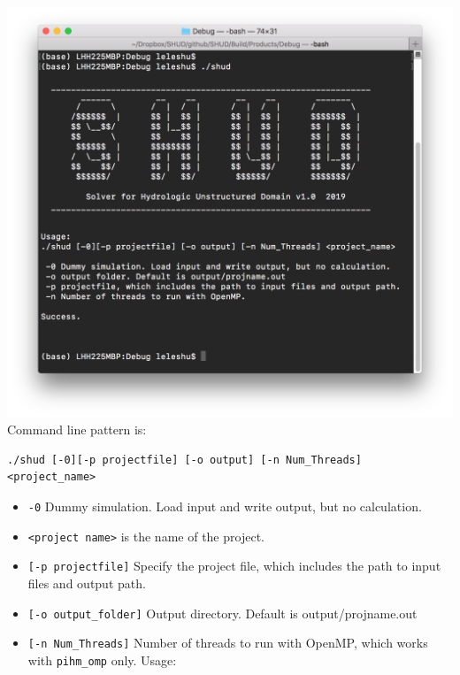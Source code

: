 \documentclass[]{scrbook}
\begin{document}
\includegraphics{Fig/CLI.png} Command line pattern is:

\begin{verbatim}
./shud [-0][-p projectfile] [-o output] [-n Num_Threads] <project_name>
\end{verbatim}

\begin{itemize}
\item
  \texttt{-0} Dummy simulation. Load input and write output, but no
  calculation.
\item
  \texttt{\textless{}project\ name\textgreater{}} is the name of the
  project.
\item
  \texttt{{[}-p\ projectfile{]}} Specify the project file, which
  includes the path to input files and output path.
\item
  \texttt{{[}-o\ output\_folder{]}} Output directory. Default is
  output/projname.out
\item
  \texttt{{[}-n\ Num\_Threads{]}} Number of threads to run with OpenMP,
  which works with \texttt{pihm\_omp} only. Usage:
\end{itemize}
\end{document}
